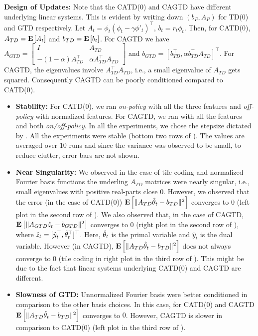 \textbf{Design of Updates:} Note that the CATD(0) and CAGTD have different underlying linear systems. This is evident by writing down $(b_P,A_P)$ for TD(0) and GTD respectively. Let $A_t=\phi_t(\phi_t-\gamma\phi'_t)^\top$, $b_t=r_t \phi_t$.
Then, for CATD(0), $A_{TD}=\mathbf{E}\left[A_t\right]$ and $b_{TD}=\mathbf{E}\left[b_t\right]$.  For CAGTD we have $A_{GTD}=\left[\begin{matrix}I & A_{TD} \\ -(1-\alpha )A_{TD}^\top &\alpha A_{TD}^\top A_{TD}\end{matrix}\right]$ and $b_{GTD}=[b_{TD}^\top,\alpha b_{TD}^\top A_{TD}]^\top$. For CAGTD, the eigenvalues involve $A_{TD}^\top A_{TD}$, i.e., a small eigenvalue of $A_{TD}$ gets squared.
Consequently CAGTD can be poorly conditioned compared to CATD(0).

\begin{itemize}[leftmargin=*]
\item \textbf{Stability:} For CATD(0), we ran  \emph{on-policy} with all the three features and \emph{off-policy} with normalized features. For CAGTD, we ran with all the features and both \emph{on/off-policy}. In all the experiments, we chose the stepsize dictated by . All the experiments were stable (bottom two rows of ). The values are averaged over $10$ runs  and since the variance was observed to be small, 
to reduce clutter, error bars are not shown.
\item \textbf{Near Singularity: } We observed in the case of tile coding and normalized Fourier basis functions the underling $A_{TD}$ matrices were nearly singular, i.e., small eigenvalues with positive real-parts close $0$. However, we observed that the error (in the case of CATD(0)) $\mathbf{E}\left[\| A_{TD}\hat{\theta}_t -b_{TD}\|^2\right]$ converges to $0$ (left plot in the second row of ). We also observed that, in the case of CAGTD, $\mathbf{E}\left[\| A_{GTD}\hat{z}_t-b_{GTD}\|^2\right]$ converges to $0$ (right plot in the second row of ), where $\hat{z}_t=[\hat{y}_t^\top,\hat{\theta}_t^\top]^\top$. Here, $\hat{\theta}_t$ is the primal variable and $\hat{y}_t$ is the dual variable. However (in CAGTD), $\mathbf{E}\left[\| A_{TD}\hat{\theta}_t-b_{TD}\|^2\right]$ does not always converge to $0$ (tile coding in right plot in the third row of ). This might be due to the fact that linear systems underlying CATD(0) and CAGTD are different. 
\item \textbf{Slowness of GTD:} Unnormalized Fourier basis were better conditioned in comparison to the other basis choices. In this case, for CATD(0) and CAGTD $\mathbf{E}\left[\| A_{TD}\hat{\theta}_t -b_{TD}\|^2\right]$ converges to $0$. However,  CAGTD is slower in comparison to CATD(0) (left plot in the third row of ). 
\end{itemize}

